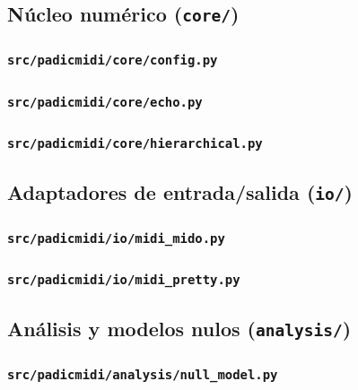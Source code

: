\documentclass[11pt,a4paper,oneside]{article}
\theoremstyle{plain}
\theoremstyle{definition}
\theoremstyle{remark}
\newcommand{\code}[1]{\texttt{\small #1}}
\begin{document}
\subsection{Núcleo numérico (\code{core/})}

\subsubsection{\code{src/padicmidi/core/config.py}}


\subsubsection{\code{src/padicmidi/core/echo.py}}


\subsubsection{\code{src/padicmidi/core/hierarchical.py}}


\subsection{Adaptadores de entrada/salida (\code{io/})}

\subsubsection{\code{src/padicmidi/io/midi\_mido.py}}


\subsubsection{\code{src/padicmidi/io/midi\_pretty.py}}


\subsection{Análisis y modelos nulos (\code{analysis/})}

\subsubsection{\code{src/padicmidi/analysis/null\_model.py}}

\end{document}
